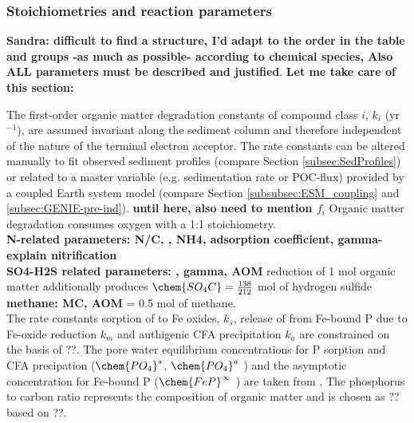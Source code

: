 \documentclass[gmd, manuscript]{copernicus}
\begin{document}
\subsubsection {Stoichiometries and reaction parameters}
\textbf{Sandra: difficult to find a structure, I'd adapt to the order in the table and groups -as much as possible- according to chemical species, Also ALL parameters must be described and justified}.
\textbf{Let me take care of this section:} 

The first-order organic matter degradation constants of compound class $i$, $k_i$ (yr$^{-1}$), are assumed invariant along the sediment column and therefore independent of the nature of the terminal electron acceptor. The rate constants can be 
altered manually to fit observed sediment profiles (compare Section \ref{subsec:SedProfiles}) or related to a master variable 
(e.g. sedimentation rate or POC-flux) provided by a coupled Earth system model (compare Section \ref{subsubsec:ESM_coupling} and \ref{subsec:GENIE-pre-ind}). 
\textbf{until here, also need to mention $f_i$}
Organic matter degradation consumes oxygen with a 1:1 stoichiometry.\\
\textbf{N-related parameters: N/C, , NH4, adsorption coefficient, gamma- explain nitrification}\\
\textbf{SO4-H2S related parameters:  ,  gamma, AOM} reduction of 1 mol organic matter additionally produces $\chem{SO_4C}=\frac{138}{212}$ mol of hydrogen sulfide \\
\textbf{methane: MC, AOM}  = 0.5 mol of methane. \\
The rate constants sorption of  to Fe oxides, $k_s$, release of  from Fe-bound P due to Fe-oxide reduction $k_m$  and 
authigenic CFA precipitation $k_a$ are constrained on the basis of ??. The pore water equilibrium concentrations for P sorption and CFA precipation 
($\chem{PO_4}^s$, $\chem{PO_4}^a$ ) and the asymptotic concentration for Fe-bound P ($\chem{FeP}^\infty$ ) are taken from  \citet{palastanga_long_term_2011}. 
The phosphorus to carbon ratio represents the composition of organic matter and is chosen as ?? based on ??.\\
\end{document}
